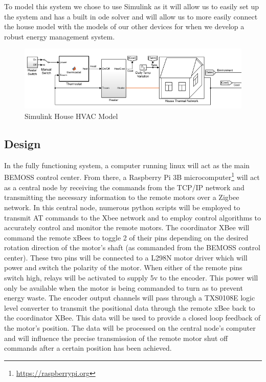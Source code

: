 \documentclass[letterpaper,12pt]{article}   %
\begin{document}
To model this system we chose to use Simulink as it will allow us to easily set up the system and has a built in ode solver and will allow us to more easily connect the house model with the models of our other devices for when we develop a robust energy management system.

\begin{figure}
    \centering
    \includegraphics[scale=.85]{figs/MATLAB/houseModel.PNG}
    \caption{Simulink House HVAC Model}
    \label{fig:my_label}
\end{figure}

\subsection{Design} \label{sec:design}
In the fully functioning system, a computer running linux will act as the main BEMOSS control center. From there, a Raspberry Pi 3B microcomputer\footnote{\url{https://raspberrypi.org}} will act as a central node by receiving the commands from the TCP/IP network and transmitting the necessary information to the remote motors over a Zigbee network. In this central node, numerous python scripts will be employed to transmit AT commands to the Xbee network and to employ control algorithms to accurately control and monitor the remote motors. The coordinator XBee will command the remote xBees to toggle 2 of their pins depending on the desired rotation direction of the motor's shaft (as commanded from the BEMOSS control center). These two pins will be connected to a L298N motor driver which will power and switch the polarity of the motor. When either of the remote pins switch high, relays will be activated to supply 5v to the encoder. This power will only be available when the motor is being commanded to turn as to prevent energy waste. The encoder output channels will pass through a TXS0108E logic level converter to transmit the positional data through the remote xBee back to the coordinator XBee. This data will be used to provide a closed loop feedback of the motor's position. The data will be processed on the central node's computer and will influence the precise transmission of the remote motor shut off commands after a certain position has been achieved. \\
\end{document}
